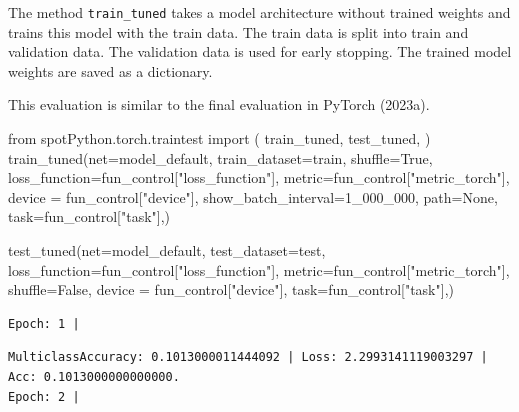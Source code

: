 \documentclass[
  letterpaper,
  DIV=11,
  numbers=noendperiod]{scrreprt}
\newenvironment{Shaded}{\begin{snugshade}}{\end{snugshade}}
\newcommand{\DecValTok}[1]{\textcolor[rgb]{0.68,0.00,0.00}{#1}}
\newcommand{\ImportTok}[1]{\textcolor[rgb]{0.00,0.46,0.62}{#1}}
\newcommand{\NormalTok}[1]{\textcolor[rgb]{0.00,0.23,0.31}{#1}}
\newcommand{\OperatorTok}[1]{\textcolor[rgb]{0.37,0.37,0.37}{#1}}
\newcommand{\StringTok}[1]{\textcolor[rgb]{0.13,0.47,0.30}{#1}}
\newcommand{\VariableTok}[1]{\textcolor[rgb]{0.07,0.07,0.07}{#1}}
\begin{document}
The method \texttt{train\_tuned} takes a model architecture without
trained weights and trains this model with the train data. The train
data is split into train and validation data. The validation data is
used for early stopping. The trained model weights are saved as a
dictionary.

This evaluation is similar to the final evaluation in PyTorch (2023a).

\begin{Shaded}
\begin{Highlighting}[]
\ImportTok{from}\NormalTok{ spotPython.torch.traintest }\ImportTok{import}\NormalTok{ (}
\NormalTok{    train\_tuned,}
\NormalTok{    test\_tuned,}
\NormalTok{    )}
\NormalTok{train\_tuned(net}\OperatorTok{=}\NormalTok{model\_default, train\_dataset}\OperatorTok{=}\NormalTok{train, shuffle}\OperatorTok{=}\VariableTok{True}\NormalTok{,}
\NormalTok{        loss\_function}\OperatorTok{=}\NormalTok{fun\_control[}\StringTok{"loss\_function"}\NormalTok{],}
\NormalTok{        metric}\OperatorTok{=}\NormalTok{fun\_control[}\StringTok{"metric\_torch"}\NormalTok{],}
\NormalTok{        device }\OperatorTok{=}\NormalTok{ fun\_control[}\StringTok{"device"}\NormalTok{], show\_batch\_interval}\OperatorTok{=}\DecValTok{1\_000\_000}\NormalTok{,}
\NormalTok{        path}\OperatorTok{=}\VariableTok{None}\NormalTok{,}
\NormalTok{        task}\OperatorTok{=}\NormalTok{fun\_control[}\StringTok{"task"}\NormalTok{],)}

\NormalTok{test\_tuned(net}\OperatorTok{=}\NormalTok{model\_default, test\_dataset}\OperatorTok{=}\NormalTok{test, }
\NormalTok{        loss\_function}\OperatorTok{=}\NormalTok{fun\_control[}\StringTok{"loss\_function"}\NormalTok{],}
\NormalTok{        metric}\OperatorTok{=}\NormalTok{fun\_control[}\StringTok{"metric\_torch"}\NormalTok{],}
\NormalTok{        shuffle}\OperatorTok{=}\VariableTok{False}\NormalTok{, }
\NormalTok{        device }\OperatorTok{=}\NormalTok{ fun\_control[}\StringTok{"device"}\NormalTok{],}
\NormalTok{        task}\OperatorTok{=}\NormalTok{fun\_control[}\StringTok{"task"}\NormalTok{],)        }
\end{Highlighting}
\end{Shaded}

\begin{verbatim}
Epoch: 1 | 
\end{verbatim}

\begin{verbatim}
MulticlassAccuracy: 0.1013000011444092 | Loss: 2.2993141119003297 | Acc: 0.1013000000000000.
Epoch: 2 | 
\end{verbatim}
\end{document}

